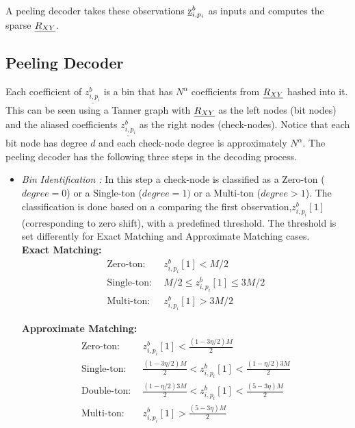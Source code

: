 \begin{enumerate}
	  A peeling decoder takes these observations $ \underline{\mathrm{z}}^{b}_{i,p_i}$ as inputs and computes the sparse $\underline{R_{XY}}$.
	 
	 \subsection{Peeling Decoder}
		
	 Each coefficient of $\underline{z^{b}_{i,p_i}}$ is a bin that has $N^{\alpha}$ coefficients from $\underline{R_{XY}}$ hashed into it. This can be seen using a Tanner graph with $\underline{R_{XY}}$ as the left nodes (bit nodes) and the aliased coefficients  $\underline{z^{b}_{i,p_i}}$ as the right nodes (check-nodes). Notice that each bit node has degree $d$ and each check-node degree is approximately $N^{\alpha}$. The peeling decoder has the following three steps in the decoding process.
		 \begin{itemize}
		 	\setlength{\itemindent}{.1in}
			 \item \textit{Bin Identification :} In this step a check-node is classified as a Zero-ton ($degree = 0$) or a Single-ton ($degree = 1)$ or a Multi-ton ($degree >1$). The classification is done based on a comparing the first observation,$z^{b}_{i,p_i}[1]$ (corresponding to zero shift), with a predefined threshold. The threshold is set differently for Exact Matching and Approximate Matching cases.\\
			 {\bf Exact Matching:} 
			                \[
			                \begin{array}{ll}
			                \text{Zero-ton:}& \ \ z^{b}_{i,p_i}[1] < M/2 \\
			                \text{Single-ton:}& \ \ M/2 \leq z^{b}_{i,p_i}[1] \leq 3M/2 \\ 
			                \text{Multi-ton:}& \ \ z^{b}_{i,p_i}[1] > 3M/2
			                \end{array}
			                \]   
			                
			 {\bf Approximate Matching:} 
			 \[
			 \begin{array}{ll}
			 \text{Zero-ton:}& \ \ z^{b}_{i,p_i}[1] < \frac{(1-3\eta/2)M}{2} \\ 
			 \text{Single-ton:}& \ \ \frac{(1-3\eta/2)M}{2} < z^{b}_{i,p_i}[1] < \frac{(1-\eta/2)3M}{2}   \\
			 \text{Double-ton:}& \ \ \frac{(1-\eta/2)3M}{2} < z^{b}_{i,p_i}[1] < \frac{(5-3\eta)M}{2}\\ 
			 \text{Multi-ton:}& \ \ z^{b}_{i,p_i}[1] > \frac{(5-3\eta)M}{2}\\
			 \end{array}
			 \] 
			   

\end{itemize}
\end{enumerate}
